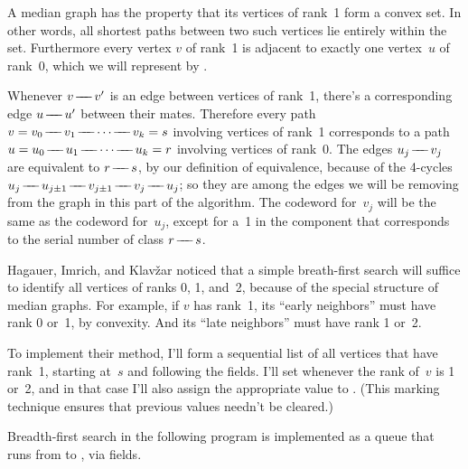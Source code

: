 A median graph has the property that its vertices of rank~1 form a
convex set. In other words, all shortest paths between two such
vertices lie entirely within the set.
Furthermore every vertex $v$ of rank~1 is adjacent to exactly one
vertex~$u$ of rank~0, which we will represent by .

Whenever $v\mathrel{\!\mathrel-\mkern-8mu\mathrel-\mkern-8mu\mathrel-\!} v'$ is an edge between vertices of rank~1, there's a
corresponding edge $u\mathrel{\!\mathrel-\mkern-8mu\mathrel-\mkern-8mu\mathrel-\!} u'$ between their mates. Therefore
every path $v=v_0\adj v_1\adj\cdots\adj v_k=s$ involving vertices
of rank~1 corresponds to a path $u=u_0\adj u_1\adj\cdots\adj u_k=r$
involving vertices of rank~0. The edges $u_j\mathrel{\!\mathrel-\mkern-8mu\mathrel-\mkern-8mu\mathrel-\!} v_j$ are
equivalent to $r\mathrel{\!\mathrel-\mkern-8mu\mathrel-\mkern-8mu\mathrel-\!} s$, by our definition of equivalence, because
of the 4-cycles $u_j\adj u_{j\pm1}\adj v_{j\pm1}\adj v_j\adj u_j$;
so they are among the edges we will be
removing from the graph in this part of the algorithm.
The codeword for~$v_j$ will be the same as the codeword for~$u_j$,
except for a~1 in the component that corresponds to the serial
number of class $r\mathrel{\!\mathrel-\mkern-8mu\mathrel-\mkern-8mu\mathrel-\!} s$.

Hagauer, Imrich, and Klav\v{z}ar noticed that a simple breath-first
search will suffice to identify all vertices of ranks 0, 1, and~2,
because of the special structure of median graphs. For example, if
$v$ has rank~1, its ``early neighbors'' must have rank 0 or~1, by
convexity. And its ``late neighbors'' must have rank 1 or~2.

To implement their method, I'll form a sequential list of all
vertices that have rank~1, starting at~$s$ and following the
 fields. I'll set  whenever the rank
of~$v$ is
1 or~2, and in that case I'll also assign the appropriate
value to . (This marking technique ensures that
previous  values needn't be cleared.)

Breadth-first search in the following program is implemented as
a queue that runs from  to , via  fields.

